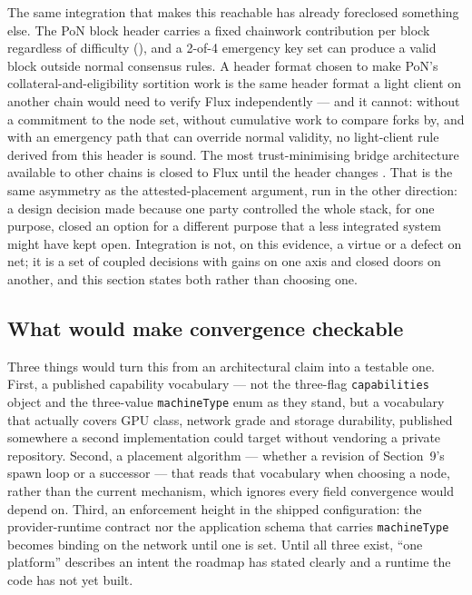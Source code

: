 The same integration that makes this reachable has already foreclosed something else. The PoN block
header carries a fixed chainwork contribution per block regardless of difficulty
(), and a 2-of-4 emergency key set can produce a valid block
outside normal consensus rules. A header format chosen to make PoN's collateral-and-eligibility
sortition work is the same header format a light client on another chain would need to verify Flux
independently — and it cannot: without a commitment to the node set, without cumulative work to
compare forks by, and with an emergency path that can override normal validity, no light-client rule
derived from this header is sound. The most trust-minimising bridge architecture available to other
chains is closed to Flux until the header changes . That is the
same asymmetry as the attested-placement argument, run in the other direction: a design decision made
because one party controlled the whole stack, for one purpose, closed an option for a different
purpose that a less integrated system might have kept open. Integration is not, on this evidence, a
virtue or a defect on net; it is a set of coupled decisions with gains on one axis and closed doors on
another, and this section states both rather than choosing one.

\subsection{What would make convergence checkable}

Three things would turn this from an architectural claim into a testable one. First, a published
capability vocabulary — not the three-flag \texttt{capabilities} object and the three-value
\texttt{machineType} enum as they stand, but a vocabulary that actually covers GPU class, network
grade and storage durability, published somewhere a second implementation could target without
vendoring a private repository. Second, a placement algorithm — whether a revision of Section~9's
spawn loop or a successor — that reads that vocabulary when choosing a node, rather than the current
mechanism, which ignores every field convergence would depend on. Third, an enforcement height in the shipped configuration:  the provider-runtime contract nor the application schema that
carries \texttt{machineType} becomes binding on the network until one is set. Until all three exist,
``one platform'' describes an intent the roadmap has stated clearly and a runtime the code has not yet
built.

\FloatBarrier
